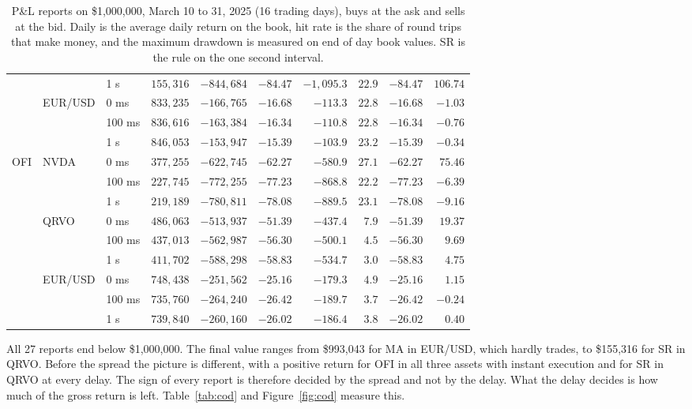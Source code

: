 \documentclass{article}
\begin{document}
\begin{table}[H]
\begin{tabular}{lllrrrrrrr}
 &  & 1 s & $155{,}316$ & $-844{,}684$ & $-84.47$ & $-1{,}095.3$ & $22.9$ & $-84.47$ & $106.74$ \\
\addlinespace[2pt]
 & EUR/USD & 0 ms & $833{,}235$ & $-166{,}765$ & $-16.68$ & $-113.3$ & $22.8$ & $-16.68$ & $-1.03$ \\
 &  & 100 ms & $836{,}616$ & $-163{,}384$ & $-16.34$ & $-110.8$ & $22.8$ & $-16.34$ & $-0.76$ \\
 &  & 1 s & $846{,}053$ & $-153{,}947$ & $-15.39$ & $-103.9$ & $23.2$ & $-15.39$ & $-0.34$ \\
\midrule
OFI & NVDA & 0 ms & $377{,}255$ & $-622{,}745$ & $-62.27$ & $-580.9$ & $27.1$ & $-62.27$ & $75.46$ \\
 &  & 100 ms & $227{,}745$ & $-772{,}255$ & $-77.23$ & $-868.8$ & $22.2$ & $-77.23$ & $-6.39$ \\
 &  & 1 s & $219{,}189$ & $-780{,}811$ & $-78.08$ & $-889.5$ & $23.1$ & $-78.08$ & $-9.16$ \\
\addlinespace[2pt]
 & QRVO & 0 ms & $486{,}063$ & $-513{,}937$ & $-51.39$ & $-437.4$ & $7.9$ & $-51.39$ & $19.37$ \\
 &  & 100 ms & $437{,}013$ & $-562{,}987$ & $-56.30$ & $-500.1$ & $4.5$ & $-56.30$ & $9.69$ \\
 &  & 1 s & $411{,}702$ & $-588{,}298$ & $-58.83$ & $-534.7$ & $3.0$ & $-58.83$ & $4.75$ \\
\addlinespace[2pt]
 & EUR/USD & 0 ms & $748{,}438$ & $-251{,}562$ & $-25.16$ & $-179.3$ & $4.9$ & $-25.16$ & $1.15$ \\
 &  & 100 ms & $735{,}760$ & $-264{,}240$ & $-26.42$ & $-189.7$ & $3.7$ & $-26.42$ & $-0.24$ \\
 &  & 1 s & $739{,}840$ & $-260{,}160$ & $-26.02$ & $-186.4$ & $3.8$ & $-26.02$ & $0.40$ \\
\bottomrule
\end{tabular}
\caption{P\&L reports on \$1,000,000, March 10 to 31, 2025 (16 trading days), buys at the ask and sells at the bid. Daily is the average daily return on the book, hit rate is the share of round trips that make money, and the maximum drawdown is measured on end of day book values. SR is the rule on the one second interval.}
\label{tab:pnl}
\end{table}

\noindent All 27 reports end below \$1,000,000. The final value ranges from \$993,043 for MA in EUR/USD, which hardly trades, to \$155,316 for SR in QRVO. Before the spread the picture is different, with a positive return for OFI in all three assets with instant execution and for SR in QRVO at every delay. The sign of every report is therefore decided by the spread and not by the delay. What the delay decides is how much of the gross return is left. Table~\ref{tab:cod} and Figure~\ref{fig:cod} measure this.
\end{document}
